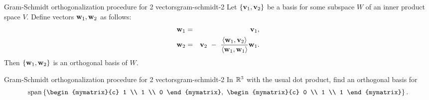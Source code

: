 \begin{proposition}{Gram-Schmidt orthogonalization procedure for 2 vectors}{gram-schmidt-2}
  Let $\set{\vect{v}_1,\vect{v}_2}$ be a basis for some subspace $W$
  of an inner product space $V$. Define vectors
  $\vect{w}_1,\vect{w}_2$ as follows:
  \begin{eqnarray*}
    \vect{w}_1 &=& \vect{v}_1, \\
    \vect{w}_2 &=& \vect{v}_2 ~-~ \frac{\iprod{\vect{w}_1,\vect{v}_2}}{\iprod{\vect{w}_1,\vect{w}_1}}\vect{w}_1.
  \end{eqnarray*}
  Then $\set{\vect{w}_1,\vect{w}_2}$ is an orthogonal basis of $W$.
\end{proposition}

\begin{example}{Gram-Schmidt orthogonalization procedure for 2 vectors}{gram-schmidt-2}
  In $\mathbb{R}^3$ with the usual dot product, find an orthogonal basis for
  \begin{equation*}
    \sspan\set{
      \begin{mymatrix}{c} 1 \\ 1 \\ 0 \end{mymatrix},~
      \begin{mymatrix}{c} 0 \\ 1 \\ 1 \end{mymatrix}
    }.
  \end{equation*}
\end{example}

